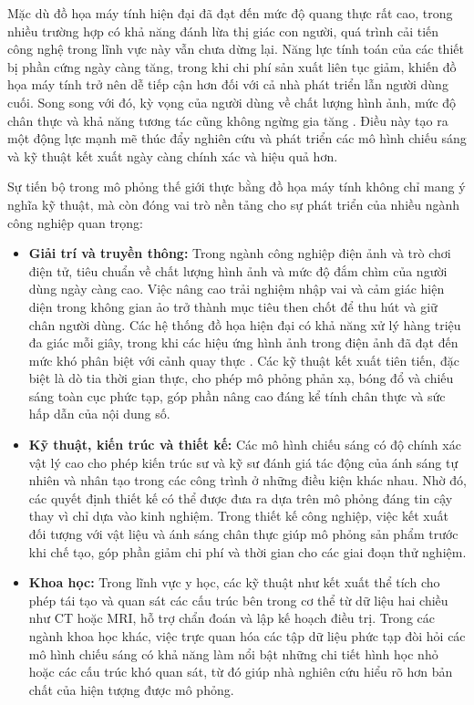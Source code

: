 Mặc dù đồ họa máy tính hiện đại đã đạt đến mức độ quang thực rất cao, trong nhiều trường hợp có khả năng đánh lừa thị giác con người, quá trình cải tiến công nghệ trong lĩnh vực này vẫn chưa dừng lại. Năng lực tính toán của các thiết bị phần cứng ngày càng tăng, trong khi chi phí sản xuất liên tục giảm, khiến đồ họa máy tính trở nên dễ tiếp cận hơn đối với cả nhà phát triển lẫn người dùng cuối. Song song với đó, kỳ vọng của người dùng về chất lượng hình ảnh, mức độ chân thực và khả năng tương tác cũng không ngừng gia tăng \cite{principles_1990}. Điều này tạo ra một động lực mạnh mẽ thúc đẩy nghiên cứu và phát triển các mô hình chiếu sáng và kỹ thuật kết xuất ngày càng chính xác và hiệu quả hơn.

Sự tiến bộ trong mô phỏng thế giới thực bằng đồ họa máy tính không chỉ mang ý nghĩa kỹ thuật, mà còn đóng vai trò nền tảng cho sự phát triển của nhiều ngành công nghiệp quan trọng:
\begin{itemize}
	\item \textbf{Giải trí và truyền thông:} Trong ngành công nghiệp điện ảnh và trò chơi điện tử, tiêu chuẩn về chất lượng hình ảnh và mức độ đắm chìm của người dùng ngày càng cao. Việc nâng cao trải nghiệm nhập vai và cảm giác hiện diện trong không gian ảo trở thành mục tiêu then chốt để thu hút và giữ chân người dùng. Các hệ thống đồ họa hiện đại có khả năng xử lý hàng triệu đa giác mỗi giây, trong khi các hiệu ứng hình ảnh trong điện ảnh đã đạt đến mức khó phân biệt với cảnh quay thực \cite{principles_1990}. Các kỹ thuật kết xuất tiên tiến, đặc biệt là dò tia thời gian thực, cho phép mô phỏng phản xạ, bóng đổ và chiếu sáng toàn cục phức tạp, góp phần nâng cao đáng kể tính chân thực và sức hấp dẫn của nội dung số.
	
	\item \textbf{Kỹ thuật, kiến trúc và thiết kế:} Các mô hình chiếu sáng có độ chính xác vật lý cao cho phép kiến trúc sư và kỹ sư đánh giá tác động của ánh sáng tự nhiên và nhân tạo trong các công trình ở những điều kiện khác nhau. Nhờ đó, các quyết định thiết kế có thể được đưa ra dựa trên mô phỏng đáng tin cậy thay vì chỉ dựa vào kinh nghiệm. Trong thiết kế công nghiệp, việc kết xuất đối tượng với vật liệu và ánh sáng chân thực giúp mô phỏng sản phẩm trước khi chế tạo, góp phần giảm chi phí và thời gian cho các giai đoạn thử nghiệm.
	
	\item \textbf{Khoa học:} Trong lĩnh vực y học, các kỹ thuật như kết xuất thể tích cho phép tái tạo và quan sát các cấu trúc bên trong cơ thể từ dữ liệu hai chiều như CT hoặc MRI, hỗ trợ chẩn đoán và lập kế hoạch điều trị. Trong các ngành khoa học khác, việc trực quan hóa các tập dữ liệu phức tạp đòi hỏi các mô hình chiếu sáng có khả năng làm nổi bật những chi tiết hình học nhỏ hoặc các cấu trúc khó quan sát, từ đó giúp nhà nghiên cứu hiểu rõ hơn bản chất của hiện tượng được mô phỏng.
\end{itemize}


